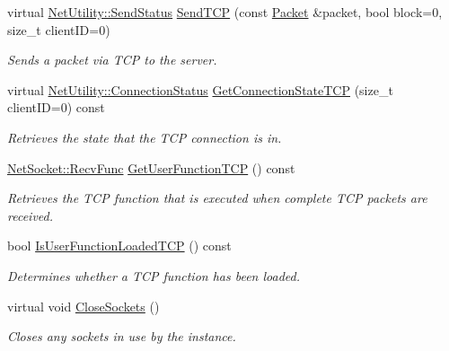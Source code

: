 \begin{DoxyCompactItemize}
virtual \hyperlink{class_net_utility_a8051eca61204ffd818281419bbf44736}{NetUtility::SendStatus} \hyperlink{class_net_instance_implemented_t_c_p_ab94301400c9a2fef68292b0b75d2d626}{SendTCP} (const \hyperlink{class_packet}{Packet} \&packet, bool block=0, size\_\-t clientID=0)
\begin{DoxyCompactList}\small\item\em Sends a packet via TCP to the server. \item\end{DoxyCompactList}\item 
virtual \hyperlink{class_net_utility_a7eae52138f8bd597ffc67ebf07e86b6d}{NetUtility::ConnectionStatus} \hyperlink{class_net_instance_implemented_t_c_p_a2ec2ee88690b8c630839e19548679aaf}{GetConnectionStateTCP} (size\_\-t clientID=0) const 
\begin{DoxyCompactList}\small\item\em Retrieves the state that the TCP connection is in. \item\end{DoxyCompactList}\item 
\hyperlink{class_net_socket_a52b5f4de8d0a47fd8620f542b21c076c}{NetSocket::RecvFunc} \hyperlink{class_net_instance_implemented_t_c_p_a4910059fe6604122fb51d868d1df34ef}{GetUserFunctionTCP} () const 
\begin{DoxyCompactList}\small\item\em Retrieves the TCP function that is executed when complete TCP packets are received. \item\end{DoxyCompactList}\item 
bool \hyperlink{class_net_instance_implemented_t_c_p_aa0f2ff9557ef143a128e6be859203d69}{IsUserFunctionLoadedTCP} () const 
\begin{DoxyCompactList}\small\item\em Determines whether a TCP function has been loaded. \item\end{DoxyCompactList}\item 
\hypertarget{class_net_instance_implemented_t_c_p_a1683ef8e0863d16dff8135f97f1e6e18}{
virtual void \hyperlink{class_net_instance_implemented_t_c_p_a1683ef8e0863d16dff8135f97f1e6e18}{CloseSockets} ()}
\label{class_net_instance_implemented_t_c_p_a1683ef8e0863d16dff8135f97f1e6e18}

\begin{DoxyCompactList}\small\item\em Closes any sockets in use by the instance. \item\end{DoxyCompactList}\end{DoxyCompactItemize}

